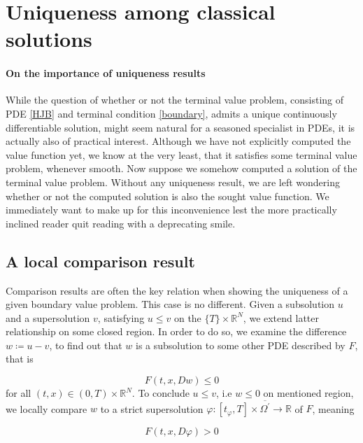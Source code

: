 
\section{Uniqueness among classical solutions}

	\paragraph{On the importance of uniqueness results}
	\label{importance uniqueness}
	
	While the question of whether or not the terminal value problem, consisting of PDE \eqref{HJB}  and terminal condition \eqref{boundary}, admits a unique continuously differentiable solution, might seem natural for a seasoned specialist in PDEs, it is actually also of practical interest. Although we have not explicitly computed the value function yet, we know at the very least, that it satisfies some terminal value problem, whenever smooth. Now suppose we somehow computed a solution of the terminal value problem. Without any uniqueness result, we are left wondering whether or not the computed solution is also the sought value function. We immediately want to make up for this inconvenience lest the more practically inclined reader quit reading with a deprecating smile.

	\subsection{A local comparison result}
	
		Comparison results are often the key relation when showing the uniqueness of a given boundary value problem. This case is no different. Given a subsolution $ u $ and a supersolution $ v $, satisfying $ u \leq v $ on the  $ \{ T \} \times \mathbb{R}^N $, we extend latter relationship on some closed region. In order to do so, we examine the difference $ w \coloneqq u - v $, to find out that $ w $ is a subsolution to some other PDE described by $ F $, that is
		
		\begin{equation*}
			F(t, x, Dw) \leq 0
		\end{equation*}
		for all $ (t, x) \in \left(0, T \right) \times \mathbb{R}^N $.
		To conclude $ u \leq v $, i.e $ w \leq 0 $ on mentioned region, we locally compare $ w $ to a strict supersolution $ \varphi : \left[ t_{\varphi}, T \right] \times \overline{\Omega^{\prime}} \to \mathbb{R} $ of $ F $, meaning
		
		\begin{equation*}
			F(t, x, D\varphi) > 0
		\end{equation*}
		
